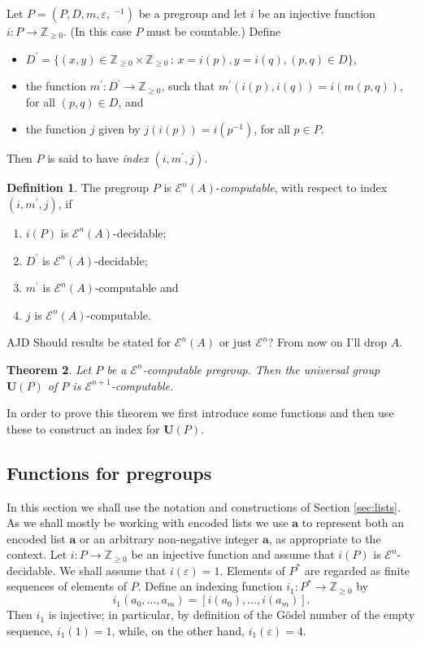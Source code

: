 \documentclass[a4paper]{article}
\newcommand{\grz}[1]{$\mathcal{E}^{#1}$}	%
\newcommand{\ZZ}{\mathbb{Z}}
\newcommand{\maps}{\longrightarrow}
\newcommand\eps{\varepsilon}
\newcommand{\avec}{\mathbf{a}}	%
\newcommand{\Uvec}{\mathbf{U}}	%
\newcommand{\UP}{\Uvec(P)}
\newcommand{\be}{\begin{enumerate}}
\newcommand{\ee}{\end{enumerate}}
\theoremstyle{plain}
\newtheorem{theorem}{Theorem}[section]
\theoremstyle{definition}
\newtheorem{definition}[theorem]{Definition}
\newenvironment{ad}{\noindent\color{blue} AJD }{}
\newcommand{\ajd}[1]{
\begin{ad} #1 \end{ad}}
\begin{document}
Let $P=(P,D,m,\eps,~^{-1})$ be a pregroup and let $i$ be an injective function $i:P\maps \ZZ_{\geq 0}$.
(In this case $P$ must be countable.)  
Define 
\begin{itemize}
\item $D^\prime=
\{(x,y)\in \ZZ_{\geq 0}\times \ZZ_{\geq 0}\,:\, x=i(p), y=i(q), (p,q)\in D\}$,
\item 
the function 
$m^\prime:D^\prime \maps \ZZ_{\geq 0}$, such that $m^\prime(i(p),i(q))=i(m(p,q))$, 
for 
all $(p,q)\in D$,  
and 
\item the function $j$  given
by $j(i(p))=i(p^{-1})$, for all $p\in P$.
\end{itemize}
Then $P$ is said to have 
{\em index} $(i,m^\prime,j)$. 
\begin{definition}
The pregroup $P$ is \grz{n}$(A)$-\emph{computable}, with respect to
index $(i,m^\prime,j)$, if 
\be
\item $i(P)$ is \grz{n}$(A)$-decidable;
\item $D^\prime$ is \grz{n}$(A)$-decidable;
\item $m^\prime$ is \grz{n}$(A)$-computable and 
\item $j$ is \grz{n}$(A)$-computable.
\ee
\end{definition}
\ajd{Should results be stated for \grz{n}$(A)$ or just \grz{n}? From now on I'll drop $A$.}


\begin{theorem}\label{thm:UPgrz} Let $P$ be a \grz{n}-computable pregroup. Then the universal group $\UP$ of $P$  
is \grz{n+1}-computable.
\end{theorem}

In order to prove this theorem we first introduce some functions and then use these to construct
an index for $\UP$. 
\subsection{Functions for pregroups}
In this section we shall use the notation and constructions  of
Section \ref{sec:lists}. As we shall mostly be working with encoded lists we use 
$\avec$ to represent both an encoded list $\avec$ or an arbitrary non-negative integer $\avec$, 
as appropriate to
the context. 
Let $i:P\maps \ZZ_{\geq 0}$ be an injective function and assume that $i(P)$ is \grz{n}-decidable.
We shall assume that $i(\eps)=1$.   
Elements of $P^*$ are regarded as finite sequences of elements of $P$.  Define an indexing function
$i_1:P^*\maps \ZZ_{\geq 0}$ by 
\begin{equation}\label{eq:imonoid}
i_1(a_0,\ldots,a_m)=[i(a_0),\ldots ,i(a_m)].
\end{equation} 
Then $i_1$ is injective; in particular, by definition of the
G\"odel number of the empty sequence,  
$i_1(1)=1$, while,  on the other hand, $i_1(\eps)= 4$.  
\end{document}
